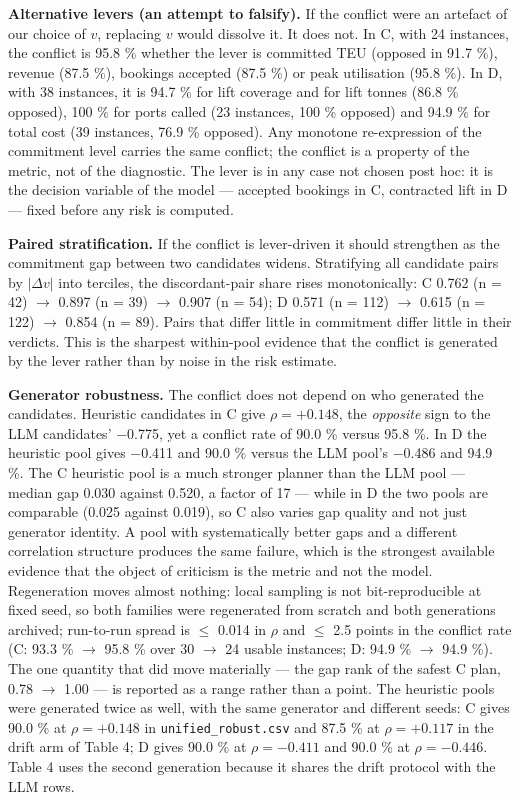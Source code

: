 \documentclass[preprint,12pt,letterpaper]{elsarticle}
\theoremstyle{definition}
\theoremstyle{plain}
\begin{document}
\textbf{Alternative levers (an attempt to falsify).} If the conflict were an artefact of our choice of $v$, replacing $v$ would dissolve it. It does not. In C, with 24 instances, the conflict is 95.8 \% whether the lever is committed TEU (opposed in 91.7 \%), revenue (87.5 \%), bookings accepted (87.5 \%) or peak utilisation (95.8 \%). In D, with 38 instances, it is 94.7 \% for lift coverage and for lift tonnes (86.8 \% opposed), 100 \% for ports called (23 instances, 100 \% opposed) and 94.9 \% for total cost (39 instances, 76.9 \% opposed). Any monotone re-expression of the commitment level carries the same conflict; the conflict is a property of the metric, not of the diagnostic. The lever is in any case not chosen post hoc: it is the decision variable of the model --- accepted bookings in C, contracted lift in D --- fixed before any risk is computed.

\textbf{Paired stratification.} If the conflict is lever-driven it should strengthen as the commitment gap between two candidates widens. Stratifying all candidate pairs by $|\Delta v|$ into terciles, the discordant-pair share rises monotonically: C 0.762 (n = 42) $\to$ 0.897 (n = 39) $\to$ 0.907 (n = 54); D 0.571 (n = 112) $\to$ 0.615 (n = 122) $\to$ 0.854 (n = 89). Pairs that differ little in commitment differ little in their verdicts. This is the sharpest within-pool evidence that the conflict is generated by the lever rather than by noise in the risk estimate.

\textbf{Generator robustness.} The conflict does not depend on who generated the candidates. Heuristic candidates in C give $\rho = +0.148$, the \textit{opposite} sign to the LLM candidates' $-$0.775, yet a conflict rate of 90.0 \% versus 95.8 \%. In D the heuristic pool gives $-$0.411 and 90.0 \% versus the LLM pool's $-$0.486 and 94.9 \%. The C heuristic pool is a much stronger planner than the LLM pool --- median gap 0.030 against 0.520, a factor of 17 --- while in D the two pools are comparable (0.025 against 0.019), so C also varies gap quality and not just generator identity. A pool with systematically better gaps and a different correlation structure produces the same failure, which is the strongest available evidence that the object of criticism is the metric and not the model. Regeneration moves almost nothing: local sampling is not bit-reproducible at fixed seed, so both families were regenerated from scratch and both generations archived; run-to-run spread is $\le$ 0.014 in $\rho$ and $\le$ 2.5 points in the conflict rate (C: 93.3 \% $\to$ 95.8 \% over 30 $\to$ 24 usable instances; D: 94.9 \% $\to$ 94.9 \%). The one quantity that did move materially --- the gap rank of the safest C plan, 0.78 $\to$ 1.00 --- is reported as a range rather than a point. The heuristic pools were generated twice as well, with the same generator and different seeds: C gives 90.0 \% at $\rho = +0.148$ in \texttt{unified\_\allowbreak{}robust.\allowbreak{}csv} and 87.5 \% at $\rho = +0.117$ in the drift arm of Table 4; D gives 90.0 \% at $\rho = -0.411$ and 90.0 \% at $\rho = -0.446$. Table 4 uses the second generation because it shares the drift protocol with the LLM rows.
\end{document}
